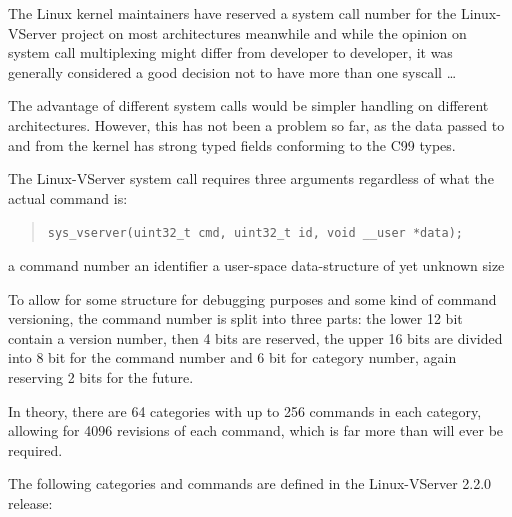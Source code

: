 The Linux kernel maintainers have reserved a system call number for the
Linux-VServer project on most architectures meanwhile  and while the opinion on
system call multiplexing might differ from developer to developer, it was
generally considered a good decision not to have more than one syscall \ldots

The advantage of different system calls would be simpler handling on different
architectures. However, this has not been a problem so far, as the data passed
to and from the kernel has strong typed fields conforming to the C99 types.

The Linux-VServer system call requires three arguments regardless of what the
actual command is:

\begin{quote}
\texttt{sys\_vserver(uint32\_t cmd, uint32\_t id, void \_\_user *data);}
\end{quote}

\begin{labeling}{}
  a command number
   an identifier
 a user-space data-structure of yet unknown size
\end{labeling}

To allow for some structure for debugging purposes and some kind of command
versioning, the command number is split into three parts: the lower 12 bit
contain a version number, then 4 bits are reserved, the upper 16 bits are
divided into 8 bit for the command number and 6 bit for category number, again
reserving 2 bits for the future.

In theory, there are 64 categories with up to 256 commands in each category,
allowing for 4096 revisions of each command, which is far more than will ever
be required.

The following categories and commands are defined in the Linux-VServer 2.2.0
release:

